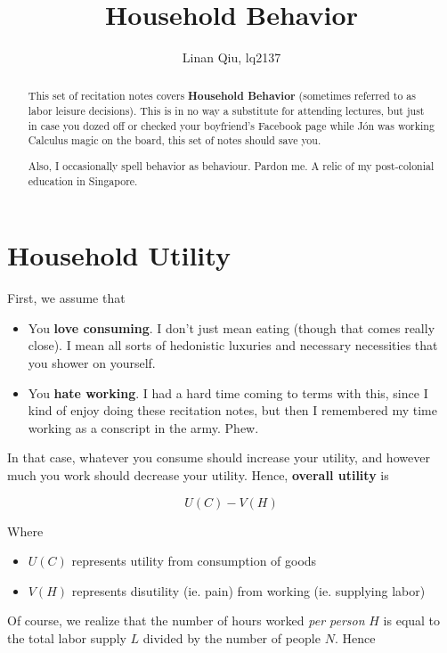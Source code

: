 \documentclass[11pt]{scrartcl}
\title{Household Behavior}
\author{Linan Qiu, lq2137}
\newcommand{\jon}{Jón }
\begin{document}
\maketitle

\begin{abstract}
This set of recitation notes covers \textbf{Household Behavior} (sometimes referred to as labor leisure decisions). This is in no way a substitute for attending lectures, but just in case you dozed off or checked your boyfriend's Facebook page while \jon was working Calculus magic on the board, this set of notes should save you.

Also, I occasionally spell behavior as behaviour. Pardon me. A relic of my post-colonial education in Singapore.
\end{abstract}

\section{Household Utility}

First, we assume that 

\begin{itemize}
	\item You \textbf{love consuming}. I don't just mean eating (though that comes really close). I mean all sorts of hedonistic luxuries and necessary necessities that you shower on yourself. 
	\item You \textbf{hate working}. I had a hard time coming to terms with this, since I kind of enjoy doing these recitation notes, but then I remembered my time working as a conscript in the army. Phew.
\end{itemize}

In that case, whatever you consume should increase your utility, and however much you work should decrease your utility. Hence, \textbf{overall utility} is

\[ U(C) - V(H)\]

Where 
\begin{itemize}
	\item $U(C)$ represents utility from consumption of goods
	\item $V(H)$ represents disutility (ie. pain) from working (ie. supplying labor)
\end{itemize}

Of course, we realize that the number of hours worked \emph{per person} $H$ is equal to the total labor supply $L$ divided by the number of people $N$. Hence
\end{document}
